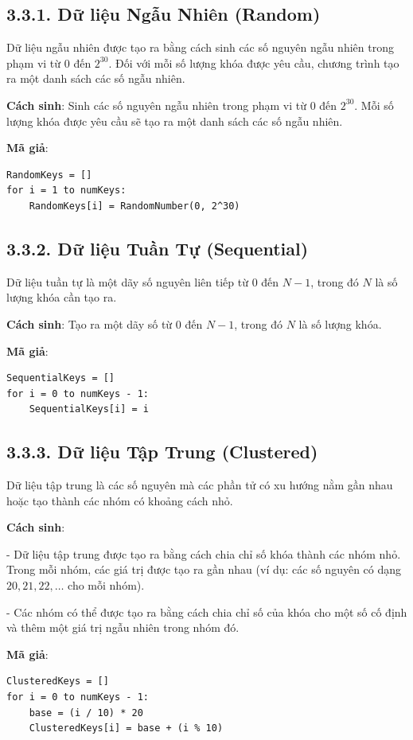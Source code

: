 \documentclass[12pt,a4paper]{report}
\begin{document}
\subsection*{3.3.1. Dữ liệu Ngẫu Nhiên (Random)}
\noindent \indent Dữ liệu ngẫu nhiên được tạo ra bằng cách sinh các số nguyên ngẫu nhiên trong phạm vi từ 0 đến \(2^{30}\). Đối với mỗi số lượng khóa được yêu cầu, chương trình tạo ra một danh sách các số ngẫu nhiên.

\textbf{Cách sinh}:  
Sinh các số nguyên ngẫu nhiên trong phạm vi từ 0 đến \(2^{30}\).
Mỗi số lượng khóa được yêu cầu sẽ tạo ra một danh sách các số ngẫu nhiên.

\textbf{Mã giả}:
\begin{lstlisting}[style=numbered]
RandomKeys = []
for i = 1 to numKeys:
    RandomKeys[i] = RandomNumber(0, 2^30)
\end{lstlisting}

\subsection*{3.3.2. Dữ liệu Tuần Tự (Sequential)}
\noindent \indent Dữ liệu tuần tự là một dãy số nguyên liên tiếp từ 0 đến \(N-1\), trong đó \(N\) là số lượng khóa cần tạo ra.

\textbf{Cách sinh}:  
Tạo ra một dãy số từ 0 đến \(N-1\), trong đó \(N\) là số lượng khóa.

\textbf{Mã giả}:
\begin{lstlisting}[style=numbered]
SequentialKeys = []
for i = 0 to numKeys - 1:
    SequentialKeys[i] = i
\end{lstlisting}

\subsection*{3.3.3. Dữ liệu Tập Trung (Clustered)}
\noindent \indent Dữ liệu tập trung là các số nguyên mà các phần tử có xu hướng nằm gần nhau hoặc tạo thành các nhóm có khoảng cách nhỏ.

\textbf{Cách sinh}:  

- Dữ liệu tập trung được tạo ra bằng cách chia chỉ số khóa thành các nhóm nhỏ. Trong mỗi nhóm, các giá trị được tạo ra gần nhau (ví dụ: các số nguyên có dạng \(20, 21, 22, \ldots\) cho mỗi nhóm).

- Các nhóm có thể được tạo ra bằng cách chia chỉ số của khóa cho một số cố định và thêm một giá trị ngẫu nhiên trong nhóm đó.

\textbf{Mã giả}:
\begin{lstlisting}[style=numbered]
ClusteredKeys = []
for i = 0 to numKeys - 1:
    base = (i / 10) * 20
    ClusteredKeys[i] = base + (i % 10)
\end{lstlisting}
\end{document}
